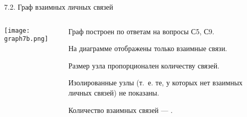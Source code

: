 \begin{frame}{7.2. Граф взаимных личных связей}

\begin{columns}
\begin{column}{0.75\textwidth} 
\centering
          \texttt{[image: graph7b.png]}
\end{column}
\begin{column}{0.25\textwidth} 
\tiny
Граф построен по ответам на вопросы С5, С9.
\smallskip

На диаграмме отображены только взаимные связи.
\smallskip

Размер узла пропорционален количеству связей.
\smallskip

Изолированные узлы (т.~е. те, у которых нет взаимных личных связей) не показаны.
\bigskip

Количество взаимных связей --- \valGBlinks.

\end{column}
\end{columns}
\end{frame}


